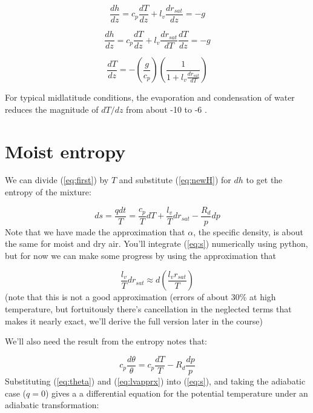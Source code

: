 \documentclass[12pt]{article}
\begin{document}
\begin{equation}
  \label{eq:newHsatKR5}
  \frac{dh}{dz}= c_p \frac{dT}{dz} + l_v \frac{d r_{sat}}{dz} =  -g
\end{equation}

\begin{equation}
  \label{eq:newHsatKR6}
  \frac{dh}{dz}= c_p \frac{dT}{dz} + l_v \frac{d r_{sat}}{dT} \frac{dT}{dz} =  -g
\end{equation}


\begin{equation}
  \label{eq:newHsatKR6b}
 \frac{dT}{dz} = - \left ( \frac{g}{c_p}  \right ) \left ( \frac{1}{1 + l_v \frac{d r_{sat}}{dT}} 
\right ) 
\end{equation}

For typical midlatitude conditions, the evaporation and condensation of water reduces the
magnitude of $dT/dz$ from about -10  to -6 .

\section{Moist entropy}
\label{sec:moist-entropy}


We can divide (\ref{eq:first}) by $T$ and
substitute (\ref{eq:newH}) for $dh$ to get
the entropy of the mixture:

\begin{equation}
  \label{eq:s}
ds = \frac{q dt}{T} = \frac{c_p}{T} dT + \frac{l_v}{T} d r_{sat} - 
\frac{R_d}{p} dp
\end{equation}
Note that we have made the approximation that $\alpha$, the specific density,
is about the same for moist and dry air.  You'll integrate (\ref{eq:s})
numerically using python, but for now we can make some progress by
using the approximation that

\begin{equation}
  \label{eq:lvapprx}
  \frac{l_v}{T} d r_{sat} \approx d \left ( \frac{l_v r_{sat}}{ T} \right )
\end{equation}
(note that this is not a good approximation (errors of about 30\% at high temperature,
but fortuitously there's cancellation in the neglected terms that makes it nearly exact, we'll
derive the full version later in the course)


We'll also need the result from the entropy notes  that:

\begin{equation}
  \label{eq:theta}
  c_p \frac{d\theta}{\theta} = c_p \frac{dT}{T} - R_d\frac{dp}{p}
\end{equation}
Substituting (\ref{eq:theta}) and (\ref{eq:lvapprx}) into
(\ref{eq:s}), and taking the adiabatic case ($q=0$) gives a
a differential equation for the potential temperature under
an adiabatic transformation:
\end{document}
